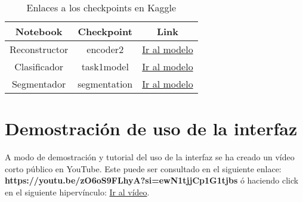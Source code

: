 \begin{table}[H]
	\centering
	\begin{tabular}{|ccc|}
		\toprule
		Notebook & Checkpoint & Link \\
		\midrule
		Reconstructor & encoder2 & \href{https://www.kaggle.com/datasets/jaimecastillo/encoder2}{Ir al modelo} \\
		Clasificador & task1model &  \href{https://www.kaggle.com/datasets/jaimecastillo/task1model}{Ir al modelo}\\
		Segmentador & segmentation & \href{https://www.kaggle.com/datasets/jaimecastillo/segmentation}{Ir al modelo}\\  
		\bottomrule
	\end{tabular}
	\caption{Enlaces a los checkpoints en Kaggle}
	\label{tabla:checkpointsKaggle}
\end{table}

\section{Demostración de uso de la interfaz}

A modo de demostración y tutorial del uso de la interfaz se ha creado un vídeo corto público en YouTube. Este puede ser consultado en el siguiente enlace: \textbf{https://youtu.be/zO6oS9FLhyA?si=ewN1tjjCp1G1tjbs}  ó haciendo click en el siguiente hipervínculo: \href{https://youtu.be/zO6oS9FLhyA?si=ewN1tjjCp1G1tjbs}{Ir al vídeo}.